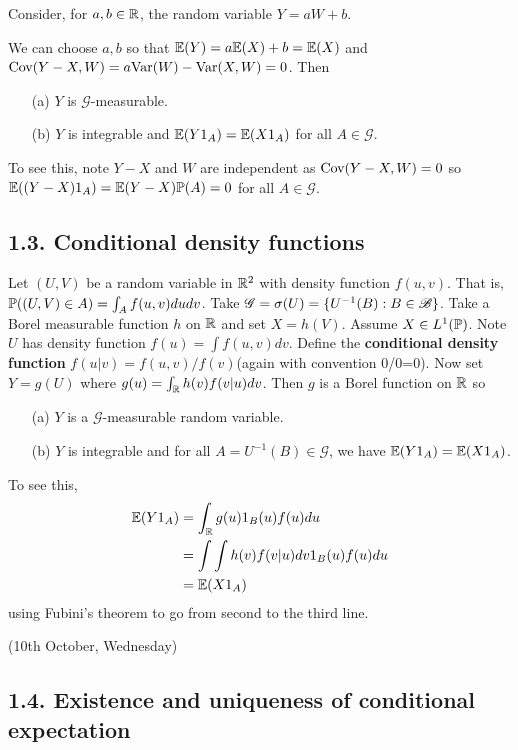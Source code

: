 \documentclass[12pt,a4paper]{report}
\begin{document}
Consider, for $a,b \in \mathbb{R}$, the random variable $Y = aW +b$.
\s

We can choose $a,b$ so that $\mathbb{E}(Y)  = a\mathbb{E}(X) + b = \mathbb{E}(X)$ and $\text{Cov}(Y-X,W) = a \text{Var}(W) - \text{Var}(X,W) =0$. Then
\begin{itemize}
\item[(a)] $Y$ is $\mathscr{G}$-measurable.
\item[(b)] $Y$ is integrable and $\mathbb{E}(Y 1_A) = \mathbb{E}(X 1_A)$ for all $A \in \mathscr{G}$.
\end{itemize}
To see this, note $Y-X$ and $W$ are independent as $\text{Cov}(Y-X, W) =0$ so $\mathbb{E}((Y-X)1_A) = \mathbb{E}(Y-X) \mathbb{P}(A) =0$ for all $A \in \mathscr{G}$.
\s

\subsection*{1.3. Conditional density functions}

Let $(U,V)$ be a random variable in $\mathbb{R}^2$ with density function $f(u,v)$. That is, $\mathbb{P}((U,V)\in A) = \int_A f(u,v)dudv$. Take $\mathscr{G} = \sigma(U) = \{ U^{-1}(B) : B \in \mathscr{B}  \}$. Take a Borel measurable function $h$ on $\mathbb{R}$ and set $X = h(V)$. Assume $X \in L^1(\mathbb{P})$. Note $U$ has density function $f(u) = \int f(u,v)dv$. Define the \textbf{conditional density function} $f(u|v) = f(u,v)/f(v)$(again with convention 0/0=0). Now set $Y=g(U)$ where $g(u) = \int_{\mathbb{R}}h(v) f(v|u)dv$. Then $g$ is a Borel function on $\mathbb{R}$ so
\begin{itemize}
\item[(a)] $Y$ is a $\mathscr{G}$-measurable random variable.
\item[(b)] $Y$ is integrable and for all $A = U^{-1}(B) \in \mathscr{G}$, we have $\mathbb{E}(Y 1_A) = \mathbb{E}(X 1_A)$.
\end{itemize}
To see this,
\begin{align*}
\mathbb{E}(Y 1_A) &= \int_{\mathbb{R}} g(u) 1_B (u) f(u) du \\
&= \int \int h(v) f(v|u) dv 1_B(u) f(u) du \\
&= \mathbb{E}(X 1_A)
\end{align*}
using Fubini's theorem to go from second to the third line.
\s

\newday

(10th October, Wednesday)
\s

\subsection*{1.4. Existence and uniqueness of conditional expectation}
\end{document}
